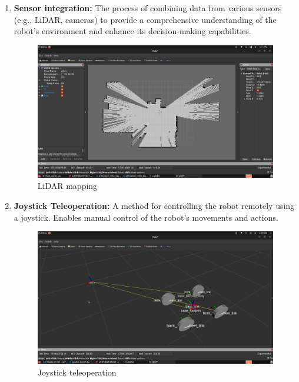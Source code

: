 {\begin{enumerate}[label=\textbf{\arabic*}., leftmargin=*]
		
		\item \textbf{Sensor integration:} The process of combining data from various sensors (e.g., LiDAR,
		cameras) to provide a comprehensive understanding of the robot's environment and
		enhance its decision-making capabilities.
		
		\begin{figure}[H]
			\centering
			\includegraphics[scale=0.15]{images/Content/lidar_mapping}
			\caption{LiDAR mapping}
			\label{fig:lidarmapping}
		\end{figure}
		
		
		\item \textbf{Joystick Teleoperation:} A method for controlling the robot remotely using a joystick.
		Enables manual control of the robot's movements and actions.
		
		\begin{figure}[H]
			\centering
			\includegraphics[scale=0.15]{images/Content/joystick_movement}
			\caption{Joystick teleoperation}
			\label{fig:joystickmovement}
		\end{figure}
		

\end{enumerate}}
